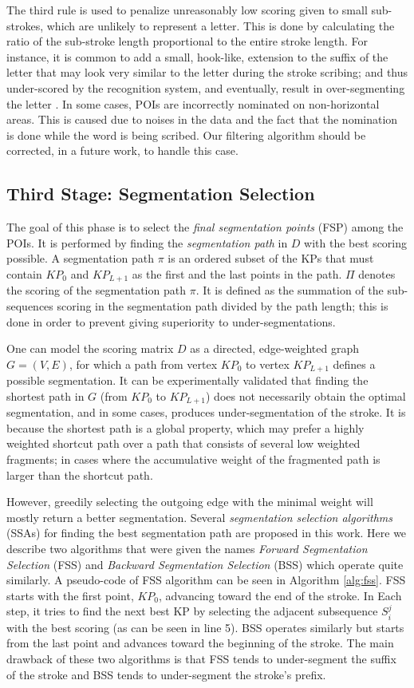 \documentclass[10pt, conference, compsocconf]{IEEEtran}
\begin{document}
The third rule is used to penalize unreasonably low scoring given to small sub-strokes, which are unlikely to represent a letter. 
This is done by calculating the ratio of the sub-stroke length proportional to the entire stroke length.
For instance, it is common to add a small, hook-like, extension to the suffix of the letter  that may look very similar to the letter  during the stroke scribing; and thus under-scored by the recognition system, and eventually, result in over-segmenting the letter . In some cases, POIs are incorrectly nominated on non-horizontal areas. This is caused due to noises in the data and the fact that the nomination is done while the word is being scribed. Our filtering algorithm should be corrected, in a future work, to handle this case.

\subsection{Third Stage: Segmentation Selection}
The goal of this phase is to select the \emph{final segmentation points} (FSP) among the POIs. 
It is performed by finding the \emph{segmentation path} in $D$ with the best scoring possible. 
A segmentation path $\pi$ is an ordered subset of the KPs that must contain $KP_{0}$ and $KP_{L+1}$ as the first and the last points in the path.
$\Pi$ denotes the scoring of the segmentation path $\pi$. 
It is defined as the summation of the sub-sequences scoring in the segmentation path divided by the path length; this is done in order to prevent giving superiority to under-segmentations.

One can model the scoring matrix $D$ as a directed, edge-weighted graph $G=(V,E)$, for which a path from vertex $KP_0$ to vertex $KP_{L+1}$ defines a possible segmentation. 
It can be experimentally validated that finding the shortest path in $G$ (from $KP_0$ to $KP_{L+1}$) does not necessarily obtain the optimal segmentation, and in some cases, produces under-segmentation of the stroke. 
It is because the shortest path is a global property, which may prefer a highly weighted shortcut path over a path that consists of several low weighted fragments; in cases where the accumulative weight of the fragmented path is larger than the shortcut path.

However, greedily selecting the outgoing edge with the minimal weight will mostly return a better segmentation.
Several \emph{segmentation selection algorithms} (SSAs) for finding the best segmentation path are proposed in this work.
Here we describe two algorithms that were given the names \emph{Forward Segmentation Selection} (FSS) and \emph{Backward Segmentation Selection} (BSS) which operate quite similarly. 
A pseudo-code of FSS algorithm can be seen in Algorithm \ref{alg:fss}. 
FSS starts with the first point, $KP_0$, advancing toward the end of the stroke. 
In Each step, it tries to find the next best KP by selecting the adjacent subsequence $S_i^j$ with the best scoring (as can be seen in line 5). 
BSS operates similarly but starts from the last point and advances toward the beginning of the stroke. 
The main drawback of these two algorithms is that FSS tends to under-segment the suffix of the stroke and BSS tends to under-segment the stroke's prefix.
\end{document}
